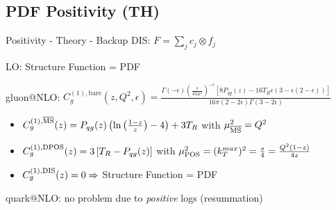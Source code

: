 \author[Felix Hekhorn]{}
\subsection{PDF Positivity (TH)}
\begin{frame}{Positivity - Theory - Backup}
DIS: $F = \sum_j c_j \otimes f_j$

LO: Structure Function = PDF

gluon@NLO: $C^{(1),\text{bare}}_{g}(z,Q^2,\epsilon) = \frac{ \Gamma(-\epsilon)
  \left(\frac{s}{4\pi\mu^2}\right)^{-\epsilon} \left[8P_{qg}(z)-16 T_R \epsilon (3
    -\epsilon(2 -\epsilon) )  \right]  }{16\pi (2 - 2\epsilon) \Gamma (3 - 2 \epsilon)}$
\begin{itemize}
\item ${C^{(1),{\overline{\rm {MS}}}}_{g}}(z) = P_{qg}(z) \left( \ln\left(\frac{1-z}{z}\right) - 4 \right) + 3T_R$ with $\mu_{{\overline{\rm {MS}}}}^2 = Q^2$
\item $C^{(1),\rm {DPOS}}_{g}(z) = 3\left[T_R- P_{qg}(z)\right]$ with $\mu_{\rm {POS}}^2 = (k_T^{max})^2 = \frac s 4 = \frac{Q^2(1-z)}{4z}$
\item ${C^{(1),\rm{DIS}}_{g}}(z) = 0 \Rightarrow$ Structure Function = PDF
\end{itemize}

quark@NLO: no problem due to \textit{positive} logs (resummation)
\end{frame}
